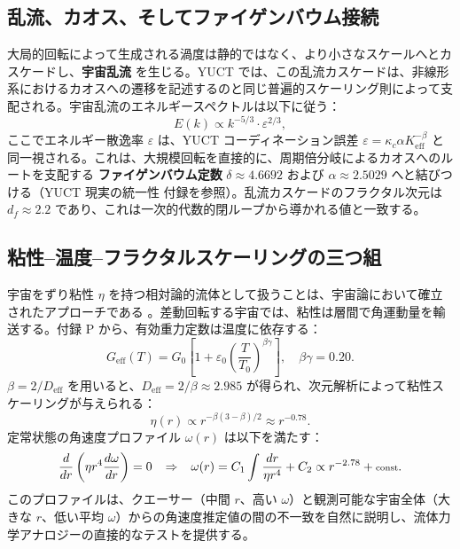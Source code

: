 \documentclass[11pt,a4paper]{article}
\begin{document}
	\subsection{乱流、カオス、そしてファイゲンバウム接続}
	
	大局的回転によって生成される渦度は静的ではなく、より小さなスケールへとカスケードし、\textbf{宇宙乱流} を生じる。YUCT では、この乱流カスケードは、非線形系におけるカオスへの遷移を記述するのと同じ普遍的スケーリング則によって支配される。宇宙乱流のエネルギースペクトルは以下に従う：
	\begin{equation}
		E(k) \propto k^{-5/3} \cdot \varepsilon^{2/3},
	\end{equation}
	ここでエネルギー散逸率 \(\varepsilon\) は、YUCT コーディネーション誤差 \(\varepsilon = \kappa_c \alpha K_{\mathrm{eff}}^{-\beta}\) と同一視される。これは、大規模回転を直接的に、周期倍分岐によるカオスへのルートを支配する \textbf{ファイゲンバウム定数} \(\delta \approx 4.6692\) および \(\alpha \approx 2.5029\) へと結びつける（YUCT 現実の統一性 付録を参照）。乱流カスケードのフラクタル次元は \(d_f \approx 2.2\) であり、これは一次的代数的閉ループから導かれる値と一致する。
	
	\subsection{粘性–温度–フラクタルスケーリングの三つ組}
	
	宇宙をずり粘性 \(\eta\) を持つ相対論的流体として扱うことは、宇宙論において確立されたアプローチである \cite{Giovannini2005}。差動回転する宇宙では、粘性は層間で角運動量を輸送する。付録 P から、有効重力定数は温度に依存する：
	\begin{equation}
		G_{\mathrm{eff}}(T) = G_0\left[1 + \varepsilon_0\left(\frac{T}{T_0}\right)^{\beta\gamma}\right], \quad \beta\gamma = 0.20.
	\end{equation}
	\(\beta = 2/D_{\mathrm{eff}}\) を用いると、\(D_{\mathrm{eff}} = 2/\beta \approx 2.985\) が得られ、次元解析によって粘性スケーリングが与えられる：
	\begin{equation}
		\eta(r) \propto r^{-\beta(3-\beta)/2} \approx r^{-0.78}.
	\end{equation}
	定常状態の角速度プロファイル \(\omega(r)\) は以下を満たす：
	\begin{equation}
		\scriptsize
		\frac{d}{dr}\left( \eta r^4 \frac{d\omega}{dr} \right) = 0 \quad \Rightarrow \quad \omega(r) = C_1 \int \frac{dr}{\eta r^4} + C_2 \propto r^{-2.78} + \text{const}.
	\end{equation}
	このプロファイルは、クエーサー（中間 \(r\)、高い \(\omega\)）と観測可能な宇宙全体（大きな \(r\)、低い平均 \(\omega\)）からの角速度推定値の間の不一致を自然に説明し、流体力学アナロジーの直接的なテストを提供する。
	
\end{document}

